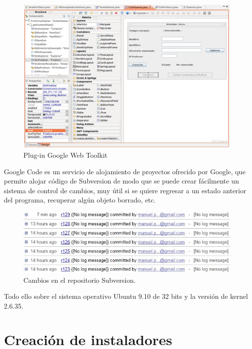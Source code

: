 \begin{figure}[width=3cm]%
    \centering
    \includegraphics{implementacion/GWT2}
    \caption{Plug-in Google Web Toolkit}
    \label{fig:implementacion:GWT}
\end{figure}


Google Code es un servicio de alojamiento de proyectos ofrecido por Google, que permite alojar código de Subversion de modo que se puede crear fácilmente un sistema de control de cambios, muy útil si se quiere regresar a un estado anterior del programa, recuperar algún objeto borrado, etc.
\newline

\begin{figure}
    \centering
    \includegraphics[width=.75\linewidth]{implementacion/svn}
    \caption{Cambios en el repositorio Subversion.}
    \label{fig:implementacion:subversion}
\end{figure}



Todo ello sobre el sistema operativo Ubuntu 9.10 de 32 bits y la versión de kernel 2.6.35.

\section{Creación de instaladores}
\label{sec:implementacion:instaladores}

